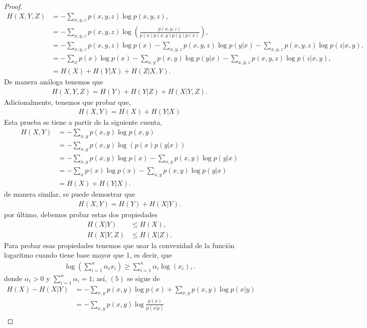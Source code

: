 \begin{enumerate}
\begin{proof}
\begin{align*}
    H(X,Y,Z) &= - \sum_{x,y,z} p(x,y,z) \log p(x,y,z),\\
&= - \sum_{x,y,z} p(x,y,z) \log \left( \frac{p(x,y,z)}{p(x) p(x,y) p(y) p(x)} \right),\\
&= - \sum_{x,y,z} p(x,y,z) \log p(x)  - \sum_{x,y,z} p(x,y,z) \log p(y|x)- \sum_{x,y,z} p(x,y,z) \log p(z|x,y),\\
&= - \sum_{x} p(x) \log p(x) - \sum_{x,y} p(x,y) \log p(y|x) - \sum_{x,y,z} p(x,y,z) \log p(z|x,y),\\
&= H(X)+ H(Y|X)+ H(Z|X,Y).
\end{align*}
De manera análoga tenemos que 
 \begin{align}
        H(X,Y,Z)=H(Y)+H(Y|Z)+H(X|Y,Z)
    .\end{align}
Adicionalmente, tenemos que probar que,
\begin{align}
    H(X,Y)=H(X)+H(Y|X)
\end{align}
Esta prueba se tiene a partir de la siguiente cuenta,
\begin{align*}
    H(X,Y) &= - \sum_{x,y} p(x,y) \log p(x,y) \\
&= - \sum_{x,y} p(x,y) \log \left( p(x) p(y|x) \right)\\ 
&= - \sum_{x,y} p(x,y) \log p(x) - \sum_{x,y} p(x,y) \log p(y|x) \\
&= - \sum_{x} p(x) \log p(x) - \sum_{x,y} p(x,y) \log p(y|x)\\ 
&= H(X) + H(Y|X)
.\end{align*}
de manera similar, se puede demostrar que 
\begin{align}
    H(X,Y)=H(Y)+H(X|Y)
.\end{align}
por último, debemos probar estas dos propiedades
\begin{align}
    H(X|Y)&\leq H(X),\\
 H(X|Y,Z)&\leq H(X|Z)
.\end{align}
Para probar esas propiedades tenemos que usar la convexidad de la función logaritmo cuando tiene base mayor que 1, es decir, que 
\begin{align*}
 \log\left(\sum_{i=1}^{n} \alpha_i x_i\right) \geq \sum_{i=1}^{n} \alpha_i \log(x_i),   
.\end{align*}
donde $\alpha_i > 0$ y $\sum_{i=1}^{n} \alpha_i = 1$; así, $(5)$ se sigue de 
\begin{align*}
H(X) - H(X|Y) &= -\sum_{x,y} p(x,y) \log p(x) + \sum_{x,y} p(x,y) \log p(x|y) \\
&= -\sum_{x,y} p(x,y) \log \frac{p(x)}{p(x|y)} \\

\end{align*}
\end{proof}
\end{enumerate}
